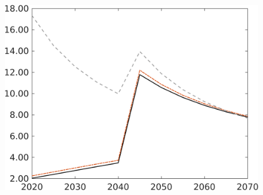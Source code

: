 \begin{figure}[h!!!]
\begin{minipage}[]{0.32\textwidth}
\end{minipage}
\begin{minipage}[]{0.32\textwidth}
\includegraphics[width=1\textwidth]{../../codding_model/own_basedOnFried/optimalPol_010922_revision/figures/all_13Sept22/CompRed_TaulCalib_gAg_spillover0_knspil0_nsk0_xgr0_sep0_LFlimit1_emsbase0_countec0_GovRev0_etaa0.79_lgd0.png}
\end{minipage}
\end{figure}

